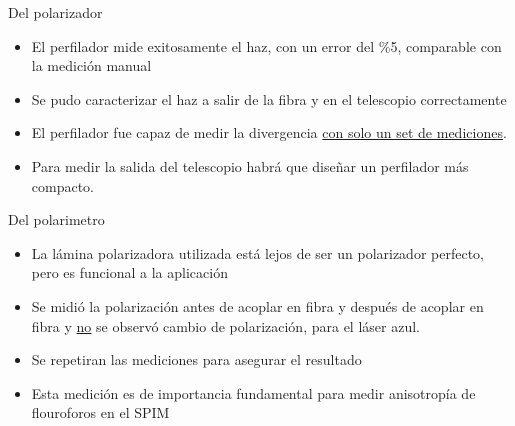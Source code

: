 
    Del polarizador
        \begin{itemize}
            \item El perfilador mide exitosamente el haz, con un error del \%5, comparable con la medición manual 
            \item Se pudo caracterizar el haz a salir de la fibra y en el telescopio correctamente
            \item El perfilador fue capaz de medir la divergencia \underline{con solo un set de mediciones}.
            \item Para medir la salida del telescopio habrá que diseñar un perfilador más compacto.
        \end{itemize}

        Del polarimetro
        \begin{itemize}
            \item La lámina polarizadora utilizada está lejos de ser un polarizador perfecto, pero es funcional a la aplicación
            \item Se midió la polarización antes de acoplar en fibra y después de acoplar en fibra y \underline{no} se observó cambio de polarización, para el láser azul.
            \item Se repetiran las mediciones para asegurar el resultado
            \item Esta medición es de importancia fundamental para medir anisotropía de flouroforos en el SPIM
        \end{itemize}


